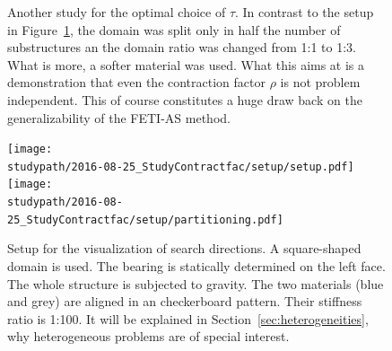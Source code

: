 \begin{figure}[ht]
  \begin{center}
    
    \caption[Choice of $\tau$ - problem 2]{Another study for the optimal choice of $\tau$. In contrast to the setup in Figure~\ref{fig:results_study_contractfac_setup2}, the domain was split only in half the number of substructures an the domain ratio was changed from 1:1 to 1:3. What is more, a softer material was used. What this aims at is a demonstration that even the contraction factor $\rho$ is not problem independent. This of course constitutes a huge draw back on the generalizability of the FETI-AS method.}
    \label{fig:results_study_contractfac_setup2}
  \end{center}
\end{figure}


\begin{figure}[ht]
  \begin{center}
    \texttt{[image: \\studypath/2016-08-25\_StudyContractfac/setup/setup.pdf]}~\hspace{1cm}
    \texttt{[image: \\studypath/2016-08-25\_StudyContractfac/setup/partitioning.pdf]}~
    \caption[Setup for visualization of search directions in FETI-S]{Setup for the visualization of search directions. A square-shaped domain is used. The bearing is statically determined on the left face. The whole structure is subjected to gravity. The two materials (blue and grey) are aligned in an checkerboard pattern. Their stiffness ratio is 1:100. It will be explained in Section~\ref{sec:heterogeneities}, why heterogeneous problems are of special interest.}
    \label{fig:setup_visualization_searchdirs}
  \end{center}
\end{figure}



